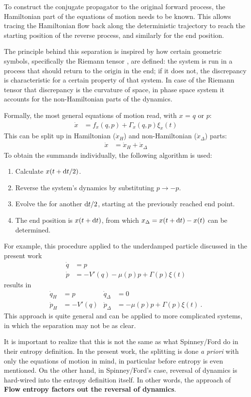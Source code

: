 To construct the conjugate propagator to the original forward process, the Hamiltonian part of the equations of motion needs to be known. This allows tracing the Hamiltonian flow back along the deterministic trajectory to reach the starting position of the reverse process, and similarly for the end position.

The principle behind this separation is inspired by how certain geometric symbols, specifically the Riemann tensor , are defined: the system is run in a process that should return to the origin in the end; if it does not, the discrepancy is characteristic for a certain property of that system. In case of the Riemann tensor that discrepancy is the curvature of space, in phase space system it accounts for the non-Hamiltonian parts of the dynamics.

Formally, the most general equations of motion read, with \(x\) = \(q\) or \(p\):
%
\begin{align}
	\dot x &= f_x(q,p) + \Gamma_x(q,p)\xi_x(t)
\end{align}
%
This can be split up in Hamiltonian (\(\dot x_H\)) and non-Hamiltonian (\(\dot x_\Delta\)) parts:
%
\begin{align}
	\dot x &= \dot x_H + \dot x_\Delta
\end{align}
%
To obtain the summands individually, the following algorithm is used:
%
\begin{enumerate}
	\item Calculate \(x(t+\mathrm{d} t/2) \).
	\item Reverse the system's dynamics by substituting \(p \to -p\).
	\item Evolve the for another \(\mathrm{d} t/2\), starting at the previously reached end point.
	\item The end position is \(x(t+\mathrm{d} t)\), from which \(x_\Delta = x(t+\mathrm{d} t) - x(t)\) can be determined.
\end{enumerate}
%
For example, this procedure applied to the underdamped particle discussed in the present work
%
\begin{align*}
	\dot q &= p \\
	\dot p &= -V'(q) - \mu(p)p + \Gamma(p)\xi(t)
\end{align*}
results in
\begin{align*}
	\dot q_H &= p  &  \dot q_\Delta &= 0 \\
	\dot p_H &= -V'(q)  &  \dot p_\Delta &= - \mu(p)p + \Gamma(p)\xi(t) ~.
\end{align*}
This approach is quite general and can be applied to more complicated systems, in which the separation may not be as clear.

It is important to realize that this is not the same as what Spinney/Ford do in their entropy definition. In the present work, the splitting is done \emph{a priori} with only the equations of motion in mind, in particular before entropy is even mentioned. On the other hand, in Spinney/Ford's case, reversal of dynamics is hard-wired into the entropy definition itself. In other words, the approach of \textbf{Flow entropy factors out the reversal of dynamics}.


